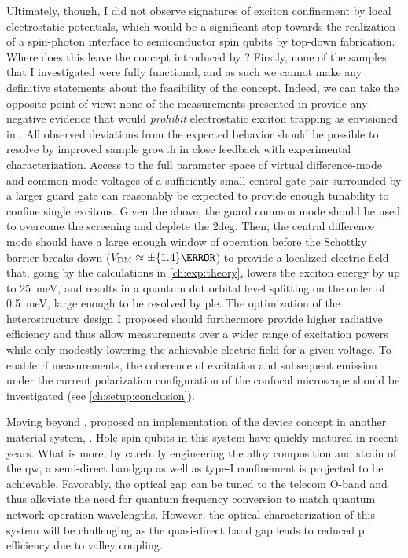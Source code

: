 Ultimately, though, I did not observe signatures of exciton confinement by local electrostatic potentials, which would be a significant step towards the realization of a spin-photon interface to semiconductor spin qubits by top-down fabrication.
Where does this leave the concept introduced by \citet{Descamps2021}?
Firstly, none of the samples that I investigated were fully functional, and as such we cannot make any definitive statements about the feasibility of the concept.
Indeed, we can take the opposite point of view: none of the measurements presented in \thethesis provide any negative evidence that would \emph{prohibit} electrostatic exciton trapping as envisioned in .
All observed deviations from the expected behavior should be possible to resolve by improved sample growth in close feedback with experimental characterization.
Access to the full parameter space of virtual difference-mode and common-mode voltages of a sufficiently small central gate pair surrounded by a larger guard gate can reasonably be expected to provide enough tunability to confine single excitons.
Given the above, the guard common mode should be used to overcome the screening and deplete the \gls{2deg}.
Then, the central difference mode should have a large enough window of operation before the Schottky barrier breaks down ($\VDM\approx\pm\qty{1.4}{\volt}$) to provide a localized electric field that, going by the calculations in \cref{ch:exp:theory}, lowers the exciton energy by up to \qty{25}{\milli\electronvolt}, and results in a quantum dot orbital level splitting on the order of \qty{0.5}{\milli\electronvolt}, large enough to be resolved by \gls{ple}.
The optimization of the heterostructure design I proposed should furthermore provide higher radiative efficiency and thus allow measurements over a wider range of excitation powers while only modestly lowering the achievable electric field for a given voltage.
To enable \gls{rf} measurements, the coherence of excitation and subsequent emission under the current polarization configuration of the confocal microscope should be investigated (see \cref{ch:setup:conclusion}).

Moving beyond , \citet{Reznikov2024} proposed an implementation of the device concept in another material system, .
Hole spin qubits in this system have quickly matured in recent years.
What is more, by carefully engineering the alloy composition and strain of the \gls{qw}, a semi-direct
bandgap as well as type-I confinement
is projected to be achievable.
Favorably, the optical gap can be tuned to the telecom O-band and thus alleviate the need for quantum frequency conversion to match quantum network operation wavelengths.
However, the optical characterization of this system will be challenging as the quasi-direct band gap leads to reduced \gls{pl} efficiency due to valley coupling.